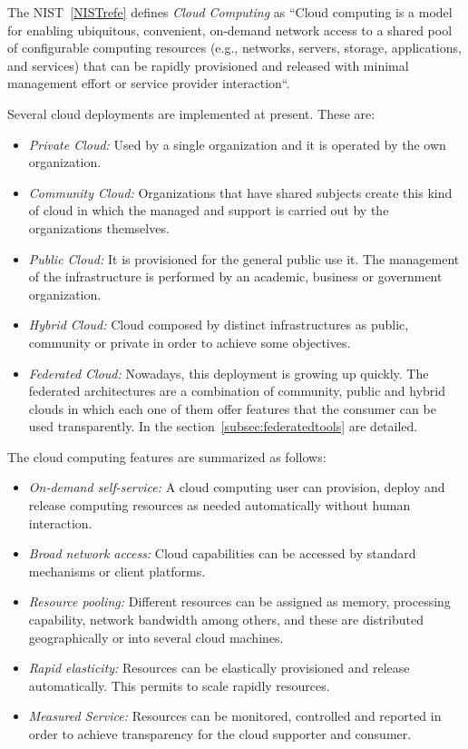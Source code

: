 The NIST~\ref{NISTrefe} defines \emph{Cloud Computing} as ``Cloud computing is a model for enabling ubiquitous, convenient, on-demand network access to a shared
pool of configurable computing resources (e.g., networks, servers, storage, applications, and services) that
can be rapidly provisioned and released with minimal management effort or
service provider interaction``.

Several cloud deployments are implemented at present. These are:
\begin{itemize}
\item \emph{Private Cloud:} Used by a single organization and it is operated by
  the own organization.
\item \emph{Community Cloud:} Organizations that have shared subjects create
  this kind of cloud in which the managed and support is carried out by the
  organizations themselves.
\item \emph{Public Cloud:} It is provisioned for the general public use it. The
  management of the infrastructure is performed by an academic, business or
  government organization.
\item \emph{Hybrid Cloud:} Cloud composed by distinct infrastructures as public,
  community or private in order to achieve some objectives.
\item \emph{Federated Cloud:} Nowadays, this deployment is growing up
  quickly. The federated architectures are a combination of community, public
  and hybrid clouds in which each one of them offer features that the consumer can
  be used transparently. In the section~\ref{subsec:federatedtools} are detailed.
\end{itemize}

The  cloud computing features are summarized as follows:
\begin{itemize}
\item \emph{On-demand self-service:} A cloud computing user can provision,
  deploy and release computing resources as needed automatically without human
  interaction.
\item \emph{Broad network access:} Cloud capabilities can be accessed by
  standard mechanisms or client platforms.
\item \emph{Resource pooling:} Different resources can be assigned as memory,
  processing capability, network bandwidth among others, and these are
  distributed geographically or into several cloud machines.
\item \emph{Rapid elasticity:} Resources can be elastically provisioned and
  release automatically. This permits to scale rapidly resources.
\item \emph{Measured Service:} Resources can be monitored, controlled and
  reported in order to achieve transparency for the cloud supporter and consumer.
\end{itemize}

